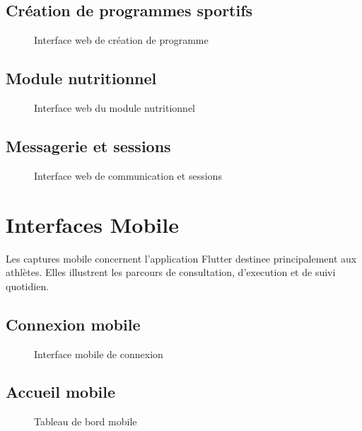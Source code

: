 \subsection{Création de programmes sportifs}
\begin{figure}[H]
\centering
{}
\caption{Interface web de création de programme}
\end{figure}

\subsection{Module nutritionnel}
\begin{figure}[H]
\centering
{}
\caption{Interface web du module nutritionnel}
\end{figure}

\subsection{Messagerie et sessions}
\begin{figure}[H]
\centering
{}
\caption{Interface web de communication et sessions}
\end{figure}

\section{Interfaces Mobile}
Les captures mobile concernent l'application Flutter destinee principalement aux athlètes. Elles illustrent les parcours de consultation, d'execution et de suivi quotidien.

\subsection{Connexion mobile}
\begin{figure}[H]
\centering
{}
\caption{Interface mobile de connexion}
\end{figure}

\subsection{Accueil mobile}
\begin{figure}[H]
\centering
{}
\caption{Tableau de bord mobile}
\end{figure}

